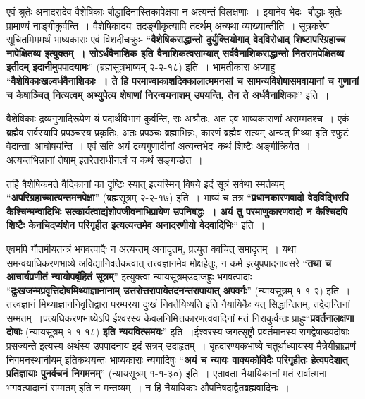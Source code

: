 {एवं श्रुतेः अनादरादेव वैशेषिकाः बौद्धादिनास्तिकापेक्षया न अत्यन्तं विलक्षणाः~। इयानेव भेदः- बौद्धाः श्रुतेः प्रामाण्यं नाङ्गीकुर्वन्ति~। वैशेषिकादयः तदङ्गीकृत्यापि तदर्थम् अन्यथा व्याख्यान्तीति~। सूत्रकरेण सूचितमिममर्थं भाष्यकाराः एवं विशदीचक्रुः- “\textbf{वैशेषिकराद्धान्तो दुर्युक्तियोगाद् वेदविरोधाद् शिष्टापरिग्रहाच्च नापेक्षितव्य इत्युक्तम्~। सोऽर्धवैनाशिक इति वैनाशिकत्वसाम्यात् सर्ववैनाशिकराद्धान्तो नितरामपेक्षितव्य इतीदम् इदानी\-मुपपादयामः}” (ब्रह्मसूत्रभाष्यम् २-२-१८) इति~। भामतीकारा अप्याहुः “\textbf{वैशेषिकाः\break खल्वर्धवैनाशिकाः~। ते हि परमाण्वाकाशदिक्कालात्ममनसां च सामन्यविशेषासमवायानां च गुणानां च केषाञ्चित् नित्यत्वम् अभ्युपेत्य शेषाणां निरन्वयनाशम् उपयन्ति, तेन ते अर्धवैनाशिकाः}” इति~। 

वैशेषिकाः द्रव्यगुणादिरूपेण यं पदार्थविभागं कुर्वन्ति, सः अश्रौतः, अत एव भाष्यकाराणां असम्मतश्च~। एकं ब्रह्मैव सर्वस्यापि प्रपञ्चस्य प्रकृतिः, अतः प्रपञ्चः ब्रह्माभिन्नः, कारणं ब्रह्मैव सत्यम् अन्यत् मिथ्या इति स्फुटं वेदान्ताः आघोषयन्ति~। एवं सति अयं द्रव्यगुणादीनां अत्यन्तभेदः कथं शिष्टैः अङ्गीक्रियेत~। अत्यन्तभिन्नानां तेषाम् इतरेतराधीनत्वं च कथं सङ्गच्छेत~। 

तर्हि वैशेषिकमते वैदिकानां का दृष्टिः स्यात् इत्यस्मिन् विषये इदं सूत्रं सर्वथा स्मर्तव्यम् “\textbf{अपरिग्रहाच्चात्यन्तमनपेक्षा}” (ब्रह्मसूत्रम् २-२-१७) इति~। भाष्यं च तत्र “\textbf{प्रधान\-कारणवादो वेदविद्भिरपि कैश्चिन्मन्वादिभिः सत्कार्यत्वाद्यंशोपजीवनाभिप्रायेण उपनिबद्धः~। अयं तु परमाणुकारणवादो न कैश्चिदपि शिष्टैः केनचिदप्यंशेन परिगृहीत इत्यत्यन्तमेव अनादरणीयो वेदवादिभिः}” इति~। 

एवमपि गौतमीयतन्त्रं भगवत्पादैः न अत्यन्तम् अनादृतम्, प्रत्युत क्वचित् समादृतम्~। यथा समन्वयाधिकरणभाष्ये अविद्यानिवर्तकत्वात् तत्त्वज्ञानमेव मोक्षहेतुः, न कर्म इत्युपपा\-दनावसरे “\textbf{तथा च आचार्यप्रणीतं न्यायोपबृंहितं सूत्रम्}” इत्युक्त्वा न्यायसूत्रम्\break उदाजह्रुः भगवत्पादाः “\textbf{दुःखजन्मप्रवृत्तिदोषमिथ्याज्ञानानाम् उत्तरोत्तरापाये\break तदनन्तरापायात् अपवर्गः}” (न्यायसूत्रम् १-१-२) इति~। तत्त्वज्ञानं मिथ्याज्ञाननि\-वृत्तिद्वारा परम्परया दुःखं निवर्तयिष्यति इति नैयायिकैः यत् सिद्धान्तितम्, तद्वेदान्तिनां सम्मतम्~।\break पत्यधिकरणभाष्येऽपि ईश्वरस्य केवलनिमित्तकारणत्ववादिनां मतं निराकुर्वन्तः प्राहुः\break “\textbf{प्रवर्तनालक्षणा दोषाः} (न्यायसूत्रम् १-१-१८) \textbf{इति न्ययवित्समयः}” इति~।\break ईश्वरस्य जगत्सृष्ट्रौ प्रवर्तमानस्य रागद्वेषाख्यदोषाः प्रसज्यन्ते इत्यस्य अर्थस्य उपपादनाय इदं सत्रम् उदाहृतम्~। बृहदारण्यकभाष्ये चतुर्थाध्यायस्य मैत्रेयीब्राह्मणं निगमनस्थानीयम् इति\break कथयन्तः भाष्यकाराः न्यगादिषुः “\textbf{अयं च न्यायः वाक्यकोविदैः परिगृहीतः हेत्वपदेशात् प्रतिज्ञायाः पुनर्वचनं निगमनम्}” (न्यायसूत्रम् १-१-३०) इति~। एतावता नैयायिकानां मतं सर्वात्मना भगवत्पादानां सम्मतम् इति न मन्तव्यम्~। न हि नैयायिकाः औपनिषदाद्वैतब्रह्मवादिनः~। 

}
